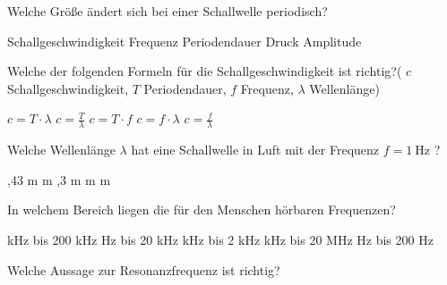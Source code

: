 \documentclass[11pt]{exam}
\begin{document}
\setlength{\voffset}{-0.5in}
\setlength{\headsep}{5pt}

\hspace{2mm}
 \hspace{5mm}
\vspace{4mm}

\begin{questions}

\question Welche Größe ändert sich bei einer Schallwelle periodisch?

\begin{choices}
	\choice Schallgeschwindigkeit
	\choice Frequenz
	\choice Periodendauer
	\choice Druck
	\choice Amplitude
\end{choices}

\vspace{3mm}\question Welche der folgenden Formeln für die Schallgeschwindigkeit ist richtig?( \( c \) Schallgeschwindigkeit, \(T \) Periodendauer, \( f \) Frequenz, \( \lambda \) Wellenlänge)

\begin{choices}
	\choice \( c=T \cdot \lambda \)
	\choice \( c=\frac{T}{\lambda} \)
	\choice \( c=T \cdot f \)
	\choice \( c=f \cdot \lambda \)
	\choice \( c=\frac{f}{\lambda} \)
\end{choices}

\vspace{3mm}\question Welche Wellenlänge \( \lambda \) hat eine Schallwelle in Luft mit der Frequenz \( f = \mathrm{1~Hz} \) ?

\begin{choices}
	,43 m
	 m
	,3 m
	 m
	 m
\end{choices}

\vspace{3mm}\question In welchem Bereich liegen die für den Menschen hörbaren Frequenzen?

\begin{choices}
	 kHz bis 200 kHz
	 Hz bis 20 kHz
	 kHz bis 2 kHz
	 kHz bis 20 MHz
	 Hz bis 200 Hz
\end{choices}

\vspace{3mm}\question Welche Aussage zur Resonanzfrequenz ist richtig?


\end{questions}
\end{document}
